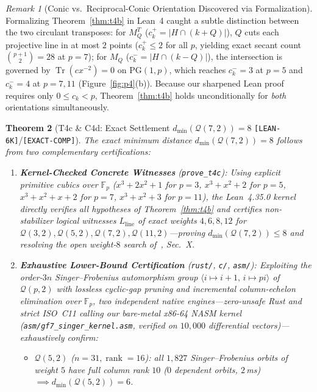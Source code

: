 \documentclass[11pt,letterpaper]{article}
\theoremstyle{plain}
\newtheorem{theorem}{Theorem}[section]
\theoremstyle{definition}
\theoremstyle{remark}
\newtheorem{remark}[theorem]{Remark}
\newcommand{\F}{\mathbb{F}}
\newcommand{\Tr}{\operatorname{Tr}}
\newcommand{\PG}{\mathrm{PG}}
\newcommand{\Qcode}{\mathcal{Q}}
\newcommand{\leanref}[1]{\textnormal{\texttt{\footnotesize #1}}}
\newcommand{\tagbadge}[1]{\textnormal{\texttt{\small [#1]}}}
\begin{document}
\begin{remark}[Conic vs.\ Reciprocal-Conic Orientation Discovered via Formalization]
Formalizing Theorem~\ref{thm:t4b} in Lean~4 caught a subtle distinction between the two circulant transposes: for $M_Q^T$ ($c_k^+=|H\cap(k+Q)|$), $Q$ cuts each projective line in at most $2$ points ($c_k^+\le 2$ for all $p$, yielding exact secant count $\binom{p+1}{2}=28$ at $p=7$); for $M_Q$ ($c_k^-=|H\cap(k-Q)|$), the intersection is governed by $\Tr(c x^{-2})=0$ on $\PG(1,p)$, which reaches $c_k^-=3$ at $p=5$ and $c_k^-=4$ at $p=7,11$ (Figure~\ref{fig:p4}(b)). Because our sharpened Lean proof requires only $0\le c_k<p$, Theorem~\ref{thm:t4b} holds unconditionally for \emph{both} orientations simultaneously.
\end{remark}

\begin{theorem}[{T4c \& C4d: Exact Settlement $d_{\min}(\Qcode(7,2))=8$ \tagbadge{LEAN-6K}/\tagbadge{EXACT-COMP}}]
\label{thm:t4c}
The exact minimum distance $d_{\min}(\Qcode(7,2))=8$ follows from two complementary certifications:
\begin{enumerate}[leftmargin=2em,itemsep=2pt]
  \item \textbf{Kernel-Checked Concrete Witnesses} (\leanref{prove\_t4c}): Using explicit primitive cubics over $\F_p$ ($x^3+2x^2+1$ for $p=3$, $x^3+x^2+2$ for $p=5$, $x^3+x^2+x+2$ for $p=7$, $x^3+x^2+3$ for $p=11$), the Lean~4.35.0 kernel directly verifies all hypotheses of Theorem~\ref{thm:t4b} and certifies non-stabilizer logical witnesses $L_{\mathrm{line}}$ of exact weights $4,6,8,12$ for $\Qcode(3,2),\Qcode(5,2),\Qcode(7,2),\Qcode(11,2)$---proving $d_{\min}(\Qcode(7,2))\le 8$ and resolving the open weight-$8$ search of~\cite{KulhandjianHanzo2026}, Sec.~X.
  \item \textbf{Exhaustive Lower-Bound Certification} (\texttt{rust/}, \texttt{c/}, \texttt{asm/}): Exploiting the order-$3n$ Singer--Frobenius automorphism group $\langle i\mapsto i+1,\,i\mapsto pi\rangle$ of $\Qcode(p,2)$ with lossless cyclic-gap pruning and incremental column-echelon elimination over $\F_p$, two independent native engines---zero-unsafe Rust and strict ISO~C11 calling our bare-metal x86-64 NASM kernel (\texttt{asm/\allowbreak gf7\_singer\_kernel.asm}, verified on $10{,}000$ differential vectors)---exhaustively confirm:
  \begin{itemize}[leftmargin=1.5em,itemsep=1pt]
    \item $\Qcode(5,2)$ ($n=31,\operatorname{rank}=16$): all $1{,}827$ Singer--Frobenius orbits of weight $5$ have full column rank $10$ ($0$ dependent orbits, $2$\,ms) $\implies d_{\min}(\Qcode(5,2))=6$.

\end{itemize}
\end{enumerate}
\end{theorem}
\end{document}

